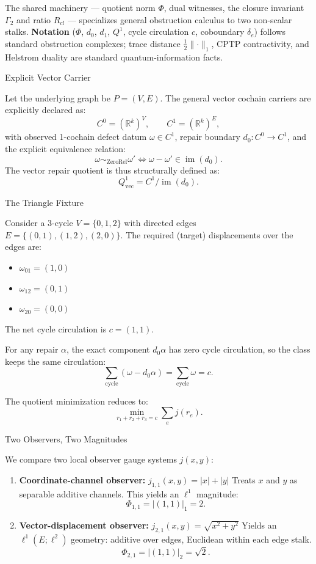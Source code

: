 \documentclass[
  11pt,
]{article}
\providecommand{\tightlist}{%
  \setlength{\itemsep}{0pt}\setlength{\parskip}{0pt}}
\providecommand{\tightlist}{%
  \setlength{\itemsep}{0pt}\setlength{\parskip}{0pt}}
\begin{document}
The shared machinery --- quotient norm \(\Phi\), dual witnesses, the closure invariant \(\Gamma_2\) and ratio \(R_{cl}\) --- specializes general obstruction calculus to two non-scalar stalks. \textbf{Notation} (\(\Phi\), \(d_0\), \(d_1\), \(Q^1\), cycle circulation \(c\), coboundary \(\delta_e\)) follows standard obstruction complexes; trace distance \(\tfrac12\lVert\cdot\rVert_1\), CPTP contractivity, and Helstrom duality are standard quantum-information facts.

Explicit Vector Carrier

Let the underlying graph be \(P = (V,E)\). The general vector cochain carriers are explicitly declared as:
\[
C^0=(\mathbb R^k)^V,\qquad
C^1=(\mathbb R^k)^E,
\]
with observed 1-cochain defect datum \(\omega\in C^1\), repair boundary \(d_0:C^0\to C^1\), and the explicit equivalence relation:
\[
\omega\sim_{\mathrm{ZeroRel}}\omega'
\iff
\omega-\omega'\in\operatorname{im}(d_0).
\]
The vector repair quotient is thus structurally defined as:
\[
Q^1_{\mathrm{vec}}=C^1/\operatorname{im}(d_0).
\]

The Triangle Fixture

Consider a 3-cycle \(V=\{0,1,2\}\) with directed edges \(E=\{(0,1),(1,2),(2,0)\}\).
The required (target) displacements over the edges are:

\begin{itemize}
\tightlist
\item
  \(\omega_{01} = (1, 0)\)
\item
  \(\omega_{12} = (0, 1)\)
\item
  \(\omega_{20} = (0, 0)\)
\end{itemize}

The net cycle circulation is \(c = (1, 1)\).

For any repair \(\alpha\), the exact component \(d_0\alpha\) has zero cycle circulation, so the class keeps the same circulation:
\[
\sum_{\text{cycle}}(\omega-d_0\alpha)=\sum_{\text{cycle}}\omega=c.
\]

The quotient minimization reduces to:
\[
\min_{r_1+r_2+r_3=c}\sum_e j(r_e).
\]

Two Observers, Two Magnitudes

We compare two local observer gauge systems \(j(x,y)\):

\begin{enumerate}
\def\labelenumi{\arabic{enumi}.}
\item
  \textbf{Coordinate-channel observer:} \(j_{1,1}(x,y)=|x|+|y|\)
  Treats \(x\) and \(y\) as separable additive channels. This yields an \(\ell^1\) magnitude:
  \[
  \Phi_{1,1}=|(1,1)|_1=2.
  \]
\item
  \textbf{Vector-displacement observer:} \(j_{2,1}(x,y)=\sqrt{x^2+y^2}\)
  Yields an \(\ell^1(E;\ell^2)\) geometry: additive over edges, Euclidean within each edge stalk.
  \[
  \Phi_{2,1}=|(1,1)|_2=\sqrt{2}.
  \]
\end{enumerate}
\end{document}
